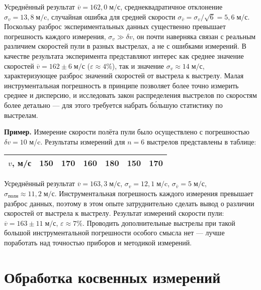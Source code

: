 \documentclass[10pt]{article}
\begin{document}
{\footnotesize{}Усреднённый результат $\overline{v}=162{,}0\;\text{м/с}$,
среднеквадратичное отклонение $\sigma_{v}=13{,}8\;\text{м/c}$, случайная
ошибка для средней скорости $\sigma_{\bar{v}}=\sigma_{v}/\sqrt{6}=5{,}6\;\text{м/с}$.
Поскольку разброс экспериментальных данных существенно превышает погрешность
каждого измерения, $\sigma_{v}\gg\delta v$, он почти наверняка связан
с реальным различием скоростей пули в разных выстрелах, а не с ошибками
измерений. В качестве результата эксперимента представляют интерес
как среднее значение скоростей $\overline{v}=162\pm6\;\text{м/с}$
($\varepsilon\approx4\%$), так и значение $\sigma_{v}\approx14\;\text{м/с}$,
характеризующее разброс значений скоростей от выстрела к выстрелу.
Малая инструментальная погрешность в принципе позволяет более точно
измерить среднее и дисперсию, и исследовать закон распределения выстрелов
по скоростям более детально --- для этого требуется набрать
б\'{о}льшую статистику по выстрелам.}{\footnotesize\par}

\textbf{\footnotesize{}Пример.}{\footnotesize{} Измерение скорости
полёта пули было осуществлено с погрешностью $\delta v=10$ м/c. Результаты
измерений для $n=6$ выстрелов представлены в таблице:}{\footnotesize\par}

{\footnotesize{}}%
\begin{tabular}{|c|c|c|c|c|c|c|}
\hline 
{\footnotesize{}$v$, м/с} & {\footnotesize{}150} & {\footnotesize{}170} & {\footnotesize{}160} & {\footnotesize{}180} & {\footnotesize{}150} & {\footnotesize{}170}\tabularnewline
\hline 
\end{tabular}{\footnotesize\par}

{\footnotesize{}Усреднённый результат $\overline{v}=163{,}3\;\text{м/с}$,
$\sigma_{v}=12{,}1\;\text{м/c}$, $\sigma_{\bar{v}}=5\;\text{м/с}$,
$\sigma_{\text{полн}}\approx11{,}2\;\text{м/с}$. Инструментальная
погрешность каждого измерения превышает разброс данных, поэтому в
этом опыте затруднительно сделать вывод о различии скоростей от выстрела
к выстрелу. Результат измерений скорости пули: $\overline{v}=163\pm11\;\text{м/с}$,
$\varepsilon\approx7\%$. Проводить дополнительные выстрелы при такой
большой инструментальной погрешности особого смысла нет ---
лучше поработать над точностью приборов и методикой измерений.}{\footnotesize\par}

\section{Обработка косвенных измерений\label{sec:kosv}}
\end{document}
